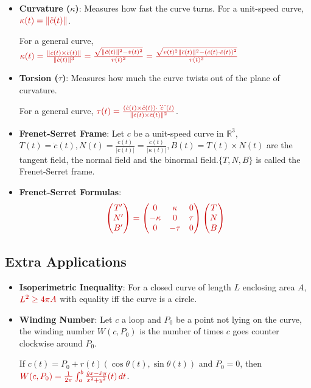 \documentclass[a4paper,12pt]{article}
\newcommand{\key}[1]{\textcolor{keywordcolor}{\textbf{#1}}}
\newcommand{\formula}[1]{\textcolor{formulacolor}{#1}}
\begin{document}
\begin{itemize}
    
    \item \key{Curvature ($\kappa$)}: Measures how fast the curve turns. For a unit-speed curve, $\formula{\kappa(t) = \|\ddot{c}(t)\|}$.\par
    For a general curve, $\formula{\kappa(t) = \frac{\|\dot{c}(t) \times \ddot{c}(t)\|}{\|\dot{c}(t)\|^3}=\frac{\sqrt{\|\ddot{c}(t)\|^2-\dot{v}(t)^2}}{v(t)^2}=\frac{\sqrt{v(t)^2\|\ddot{c}(t)\|^2-\left(\dot{c}(t)\cdot\ddot{c}(t)\right)^2}}{v(t)^3}}$
    \item \key{Torsion ($\tau$)}: Measures how much the curve twists out of the plane of curvature.\par
    For a general curve, $\formula{\tau(t) = \frac{(\dot{c}(t) \times \ddot{c}(t)) \cdot \dddot{c}(t)}{\|\dot{c}(t) \times \ddot{c}(t)\|^2}}$.
    \item \key{Frenet-Serret Frame}: Let $c$ be a unit-speed curve in $\mathbb{R}^3$, \formula{$T(t) = \dot{c}(t),N(t) = \frac{\ddot{c}(t)}{\left|\ddot{c}(t)\right|}=\frac{\ddot{c}(t)}{\left|\kappa(t)\right|},B(t)= T(t) \times N(t)$} are the tangent field, the normal field and the binormal field.$\{T, N, B\}$ is called the Frenet-Serret frame.
    \item \key{Frenet-Serret Formulas}:
    \begin{equation}
        \formula{\begin{pmatrix} T' \\ N' \\ B' \end{pmatrix} = \begin{pmatrix} 0 & \kappa & 0 \\ -\kappa & 0 & \tau \\ 0 & -\tau & 0 \end{pmatrix} \begin{pmatrix} T \\ N \\ B \end{pmatrix}}
    \end{equation}
\end{itemize}

\subsection{Extra Applications}

\begin{itemize}
    \item \key{Isoperimetric Inequality}: For a closed curve of length $L$ enclosing area $A$, $\formula{L^2 \geq 4\pi A}$ with equality iff the curve is a circle.
    \item \key{Winding Number}: Let $c$ a loop and $P_0$ be a point not lying on the curve, the winding number $W(c,P_0)$ is the number of times $c$ goes counter clockwise around $P_0$.\par
    If $c(t)=P_0+r(t)\left(\cos\theta(t),\sin\theta(t)\right)$ and $P_0=0$, then $\formula{W(c,P_0) = \frac{1}{2\pi}\int_a^b\frac{\dot{y}x-\dot{x}y}{x^2+y^2}(t) \, dt}$.
\end{itemize}
\end{document}
